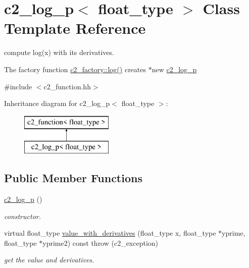 \hypertarget{classc2__log__p}{\section{c2\-\_\-log\-\_\-p$<$ float\-\_\-type $>$ Class Template Reference}
\label{classc2__log__p}
}


compute log(x) with its derivatives.

The factory function \hyperlink{classc2__factory_af20c7c4fee421c8ee0b51bac1c42302e}{c2\-\_\-factory\-::log()} creates $\ast$new \hyperlink{classc2__log__p}{c2\-\_\-log\-\_\-p}  




{\ttfamily \#include $<$c2\-\_\-function.\-hh$>$}

Inheritance diagram for c2\-\_\-log\-\_\-p$<$ float\-\_\-type $>$\-:\begin{figure}[H]
\begin{center}
\leavevmode
\includegraphics[height=2.000000cm]{classc2__log__p}
\end{center}
\end{figure}
\subsection*{Public Member Functions}
\begin{DoxyCompactItemize}
\item 
\hypertarget{classc2__log__p_a53da98f4d84ed9d95352b3b06f7a7a55}{\hyperlink{classc2__log__p_a53da98f4d84ed9d95352b3b06f7a7a55}{c2\-\_\-log\-\_\-p} ()}\label{classc2__log__p_a53da98f4d84ed9d95352b3b06f7a7a55}

\begin{DoxyCompactList}\small\item\em constructor. \end{DoxyCompactList}\item 
virtual float\-\_\-type \hyperlink{classc2__log__p_acd98067684930659e4a47390385e56b3}{value\-\_\-with\-\_\-derivatives} (float\-\_\-type x, float\-\_\-type $\ast$yprime, float\-\_\-type $\ast$yprime2) const   throw (c2\-\_\-exception)
\begin{DoxyCompactList}\small\item\em get the value and derivatives. \end{DoxyCompactList}\end{DoxyCompactItemize}
